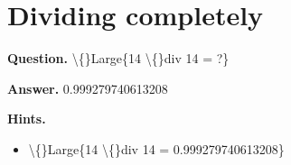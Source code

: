 \documentclass{article}
\begin{document}
\section*{Dividing completely}
\textbf{Question.} \textbackslash\{\}Large\{14 \textbackslash\{\}div 14 = ?\}

\textbf{Answer.} 0.999279740613208

\textbf{Hints.}
\begin{itemize}
  \item \textbackslash\{\}Large\{14 \textbackslash\{\}div 14 = 0.999279740613208\}
\end{itemize}
\end{document}

